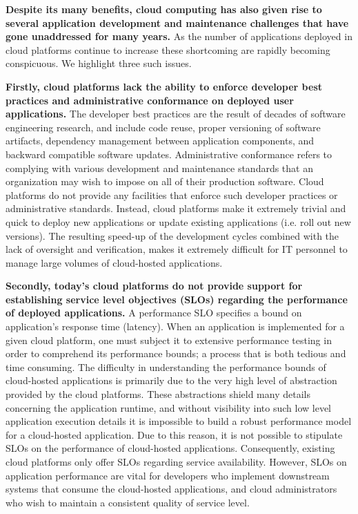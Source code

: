 \textbf{Despite its many benefits, cloud computing has also given rise to several application
development and maintenance challenges that have gone unaddressed for many years.}
As the number of applications deployed in cloud platforms continue to increase these
shortcoming are rapidly becoming conspicuous. We highlight three such issues.
 
\textbf{Firstly, cloud platforms lack the ability to enforce developer best practices
and administrative conformance on deployed user applications.} The developer best practices 
are the result of decades of software engineering research, and
include code reuse, proper versioning of software artifacts, dependency management
between application components, and backward compatible software updates. Administrative
conformance refers to complying with various development and maintenance standards
that an organization may wish to impose on all of their production software.
Cloud platforms do not provide any facilities that enforce such developer practices or
administrative standards. Instead, cloud platforms
make it extremely trivial and quick to deploy new applications or update existing
applications (i.e. roll out new versions). The resulting speed-up of the development cycles combined with the lack of 
oversight and verification, makes it extremely difficult for 
IT personnel to manage large volumes of cloud-hosted applications.

\textbf{Secondly, today's cloud platforms do not provide support for establishing 
service level objectives (SLOs) regarding the performance of deployed applications.} 
A performance SLO specifies a bound on application's
response time (latency). When an application is implemented for
a given cloud platform, one must subject it to extensive performance testing in order
to comprehend its performance bounds; a process that is both 
tedious and time consuming. The difficulty in understanding the performance 
bounds of cloud-hosted applications is primarily due to the very high level of 
abstraction provided by the cloud platforms. These abstractions shield many details 
concerning the application runtime, and without visibility into such low level application 
execution details it is impossible
to build a robust performance model for a cloud-hosted application. Due to this
reason, it is not possible to stipulate SLOs on the performance of cloud-hosted applications. 
Consequently, existing cloud platforms only offer SLOs regarding service availability.
However, SLOs on application performance are vital for developers 
who implement downstream systems that consume the cloud-hosted applications,
and cloud administrators who wish to maintain a consistent quality of service
level.

